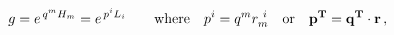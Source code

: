 \begin{equation}
\label{HK} g=e^{\, q^m H_m}=e^{\, p^i L_i} \qquad {\rm where} \quad p^i= q^m
r_m^{~i}
\quad{\rm or}\quad{\bf p^T= q^T\cdot r} \, ,
\end{equation} 
